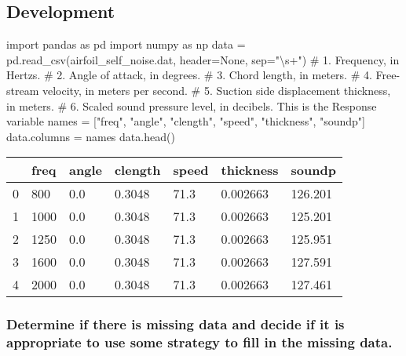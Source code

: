 \documentclass[
  letterpaper,
  DIV=11,
  numbers=noendperiod]{scrartcl}
\newenvironment{Shaded}{\begin{snugshade}}{\end{snugshade}}
\newcommand{\CommentTok}[1]{\textcolor[rgb]{0.37,0.37,0.37}{#1}}
\newcommand{\ImportTok}[1]{\textcolor[rgb]{0.00,0.46,0.62}{#1}}
\newcommand{\NormalTok}[1]{\textcolor[rgb]{0.00,0.23,0.31}{#1}}
\newcommand{\OperatorTok}[1]{\textcolor[rgb]{0.37,0.37,0.37}{#1}}
\newcommand{\StringTok}[1]{\textcolor[rgb]{0.13,0.47,0.30}{#1}}
\newcommand{\VariableTok}[1]{\textcolor[rgb]{0.07,0.07,0.07}{#1}}
\begin{document}
\hypertarget{development}{%
\subsection{Development}\label{development}}

\begin{Shaded}
\begin{Highlighting}[]
\ImportTok{import}\NormalTok{ pandas }\ImportTok{as}\NormalTok{ pd}
\ImportTok{import}\NormalTok{ numpy }\ImportTok{as}\NormalTok{ np}
\NormalTok{data }\OperatorTok{=}\NormalTok{ pd.read\_csv(}\StringTok{\textquotesingle{}airfoil\_self\_noise.dat\textquotesingle{}}\NormalTok{, header}\OperatorTok{=}\VariableTok{None}\NormalTok{, sep}\OperatorTok{=}\StringTok{"\textbackslash{}s+"}\NormalTok{)}
\CommentTok{\# 1. Frequency, in Hertzs.}
\CommentTok{\# 2. Angle of attack, in degrees.}
\CommentTok{\# 3. Chord length, in meters.}
\CommentTok{\# 4. Free{-}stream velocity, in meters per second.}
\CommentTok{\# 5. Suction side displacement thickness, in meters.}
\CommentTok{\# 6. Scaled sound pressure level, in decibels. This is the Response variable}
\NormalTok{names }\OperatorTok{=}\NormalTok{ [}\StringTok{"freq"}\NormalTok{, }\StringTok{"angle"}\NormalTok{, }\StringTok{"clength"}\NormalTok{, }\StringTok{"speed"}\NormalTok{, }\StringTok{"thickness"}\NormalTok{, }\StringTok{"soundp"}\NormalTok{]}
\NormalTok{data.columns }\OperatorTok{=}\NormalTok{ names}
\NormalTok{data.head()}
\end{Highlighting}
\end{Shaded}

\begin{longtable}[]{@{}lllllll@{}}
\toprule()
& freq & angle & clength & speed & thickness & soundp \\
\midrule()
\endhead
0 & 800 & 0.0 & 0.3048 & 71.3 & 0.002663 & 126.201 \\
1 & 1000 & 0.0 & 0.3048 & 71.3 & 0.002663 & 125.201 \\
2 & 1250 & 0.0 & 0.3048 & 71.3 & 0.002663 & 125.951 \\
3 & 1600 & 0.0 & 0.3048 & 71.3 & 0.002663 & 127.591 \\
4 & 2000 & 0.0 & 0.3048 & 71.3 & 0.002663 & 127.461 \\
\bottomrule()
\end{longtable}

\hypertarget{determine-if-there-is-missing-data-and-decide-if-it-is-appropriate-to-use-some-strategy-to-fill-in-the-missing-data.}{%
\subsubsection{Determine if there is missing data and decide if it is
appropriate to use some strategy to fill in the missing
data.}\label{determine-if-there-is-missing-data-and-decide-if-it-is-appropriate-to-use-some-strategy-to-fill-in-the-missing-data.}}
\end{document}
